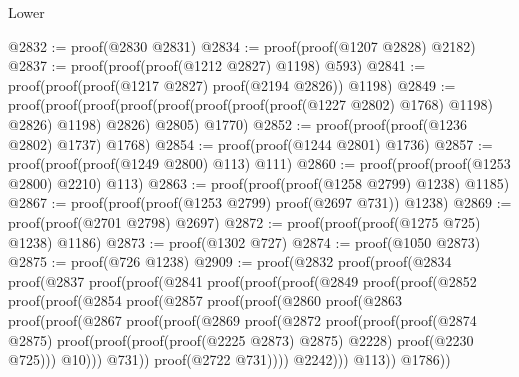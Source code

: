 \begin{lexlean}{Lower}
\begin{coremodule}
@2832 := proof(@2830 @2831)
@2834 := proof(proof(@1207 @2828) @2182)
@2837 := proof(proof(proof(@1212 @2827) @1198) @593)
@2841 := proof(proof(proof(@1217 @2827) proof(@2194 @2826)) @1198)
@2849 := proof(proof(proof(proof(proof(proof(proof(proof(@1227 @2802) @1768) @1198) @2826) @1198)
          @2826)
        @2805)
      @1770)
@2852 := proof(proof(proof(@1236 @2802) @1737) @1768)
@2854 := proof(proof(@1244 @2801) @1736)
@2857 := proof(proof(proof(@1249 @2800) @113) @111)
@2860 := proof(proof(proof(@1253 @2800) @2210) @113)
@2863 := proof(proof(proof(@1258 @2799) @1238) @1185)
@2867 := proof(proof(proof(@1253 @2799) proof(@2697 @731)) @1238)
@2869 := proof(proof(@2701 @2798) @2697)
@2872 := proof(proof(proof(@1275 @725) @1238) @1186)
@2873 := proof(@1302 @727)
@2874 := proof(@1050 @2873)
@2875 := proof(@726 @1238)
@2909 := proof(@2832
      proof(proof(@2834
            proof(@2837
                proof(proof(@2841
                      proof(proof(proof(@2849
                              proof(proof(@2852
                                    proof(proof(@2854
                                          proof(@2857
                                              proof(proof(@2860
                                                    proof(@2863
                                                        proof(proof(@2867
                                                              proof(proof(@2869
                                                                    proof(@2872
                                                                        proof(proof(proof(@2874
                                                                                @2875)
                                                                              proof(proof(proof(proof(@2225
                                                                                        @2873)
                                                                                      @2875)
                                                                                    @2228)
                                                                                  proof(@2230
                                                                                      @725)))
                                                                            @10)))
                                                                  @731))
                                                            proof(@2722 @731))))
                                                  @2242)))
                                        @113))
                                  @1786))

\end{coremodule}
\end{lexlean}

